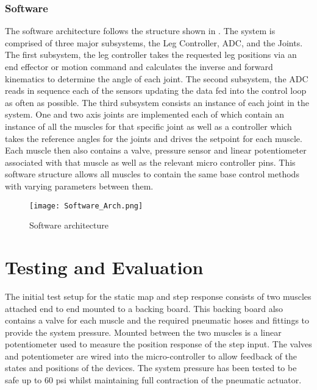 \documentclass[11pt,a4paper]{article}
\begin{document}
\subsubsection{Software}
\label{sub:software}
The software architecture follows the structure shown in . The system is comprised of three major subsystems, the Leg Controller, ADC, and the Joints. The first subsystem, the leg controller takes the requested leg positions via an end effector or motion command and calculates the inverse and forward kinematics to determine the angle of each joint. The second subsystem, the ADC reads in sequence each of the sensors updating the data fed into the control loop as often as possible. The third subsystem consists an instance of each joint in the system. One and two axis joints are implemented each of which contain an instance of all the muscles for that specific joint as well as a controller which takes the reference angles for the joints and drives the setpoint for each muscle. Each muscle then also contains a valve, pressure sensor and linear potentiometer associated with that muscle as well as the relevant micro controller pins. This software structure allows all muscles to contain the same base control methods with varying parameters between them.

\begin{figure}[hbt!]
    \centering
    \caption{Software architecture}
    \texttt{[image: Software\_Arch.png]}
    \label{fig:software_arch}
\end{figure}

\clearpage
\section{Testing and Evaluation}
\label{sec:results}


The initial test setup for the static map and step response consists of two muscles attached end to end mounted to a backing board. This backing board also contains a valve for each muscle and the required pneumatic hoses and fittings to provide the system pressure. Mounted between the two muscles is a linear potentiometer used to measure the position response of the step input. The valves and potentiometer are wired into the micro-controller to allow feedback of the states and positions of the devices. The system pressure has been tested to be safe up to 60 psi whilst maintaining full contraction of the pneumatic actuator.\newline
\end{document}
